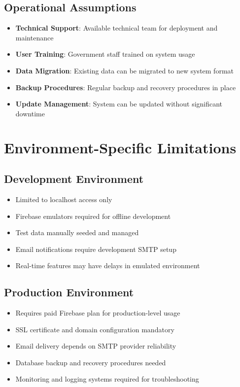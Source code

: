 \documentclass[12pt,a4paper]{article}
\begin{document}
\subsection{Operational Assumptions}

\begin{itemize}[leftmargin=*]
    \item \textbf{Technical Support}: Available technical team for deployment and maintenance
    \item \textbf{User Training}: Government staff trained on system usage
    \item \textbf{Data Migration}: Existing data can be migrated to new system format
    \item \textbf{Backup Procedures}: Regular backup and recovery procedures in place
    \item \textbf{Update Management}: System can be updated without significant downtime
\end{itemize}

\section{Environment-Specific Limitations}

\subsection{Development Environment}

\begin{itemize}[leftmargin=*]
    \item Limited to localhost access only
    \item Firebase emulators required for offline development
    \item Test data manually seeded and managed
    \item Email notifications require development SMTP setup
    \item Real-time features may have delays in emulated environment
\end{itemize}

\subsection{Production Environment}

\begin{itemize}[leftmargin=*]
    \item Requires paid Firebase plan for production-level usage
    \item SSL certificate and domain configuration mandatory
    \item Email delivery depends on SMTP provider reliability
    \item Database backup and recovery procedures needed
    \item Monitoring and logging systems required for troubleshooting
\end{itemize}
\end{document}

